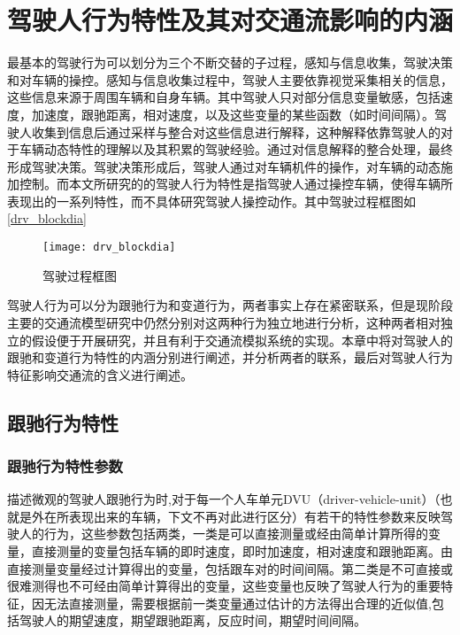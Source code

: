 \chapter{驾驶人行为特性及其对交通流影响的内涵}
最基本的驾驶行为可以划分为三个不断交替的子过程，感知与信息收集，驾驶决策和对车辆的操控。感知与信息收集过程中，驾驶人主要依靠视觉采集相关的信息，这些信息来源于周围车辆和自身车辆。其中驾驶人只对部分信息变量敏感，包括速度，加速度，跟驰距离，相对速度，以及这些变量的某些函数（如时间间隔）。驾驶人收集到信息后通过采样与整合对这些信息进行解释，这种解释依靠驾驶人的对于车辆动态特性的理解以及其积累的驾驶经验。通过对信息解释的整合处理，最终形成驾驶决策。驾驶决策形成后，驾驶人通过对车辆机件的操作，对车辆的动态施加控制。而本文所研究的的驾驶人行为特性是指驾驶人通过操控车辆，使得车辆所表现出的一系列特性，而不具体研究驾驶人操控动作。其中驾驶过程框图如
\autoref{drv_blockdia}


\begin{figure}[htpb]
	\centering
	\texttt{[image: drv\_blockdia]}
	\caption{驾驶过程框图}
	\label{drv_blockdia}
\end{figure}
驾驶人行为可以分为跟驰行为和变道行为，两者事实上存在紧密联系，但是现阶段主要的交通流模型研究中仍然分别对这两种行为独立地进行分析，这种两者相对独立的假设便于开展研究，并且有利于交通流模拟系统的实现。本章中将对驾驶人的跟驰和变道行为特性的内涵分别进行阐述，并分析两者的联系，最后对驾驶人行为特征影响交通流的含义进行阐述。

\section{跟驰行为特性}

\subsection{跟驰行为特性参数}
描述微观的驾驶人跟驰行为时,对于每一个人车单元DVU（driver-vehicle-unit）（也就是外在所表现出来的车辆，下文不再对此进行区分）有若干的特性参数来反映驾驶人的行为，这些参数包括两类，一类是可以直接测量或经由简单计算所得的变量，直接测量的变量包括车辆的即时速度，即时加速度，相对速度和跟驰距离。由直接测量变量经过计算得出的变量，包括跟车对的时间间隔。第二类是不可直接或很难测得也不可经由简单计算得出的变量，这些变量也反映了驾驶人行为的重要特征，因无法直接测量，需要根据前一类变量通过估计的方法得出合理的近似值,包括驾驶人的期望速度，期望跟驰距离，反应时间，期望时间间隔。

